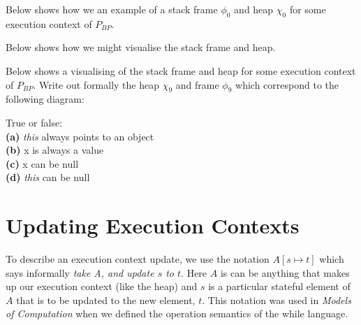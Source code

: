 \frmrule

\begin{example}
Below shows how we an example of a stack frame $\phi_0$ and heap $\chi_0$ 
for some execution context of $P_{BP}$. 


Below shows how we might visualise the stack frame and heap.

\end{example}

\frmrule

\begin{example}
Below shows a visualising of the stack frame and heap for 
some execution context of $P_{BP}$.
Write out formally the heap $\chi_9$ and frame $\phi_9$ 
which correspond to the following diagram:

\end{example}


\frmrule

\begin{example}
True or false: \\
\textbf{(a)} \textit{this} always points to an object \\
\textbf{(b)} x is always a value \\
\textbf{(c)} x can be null \\
\textbf{(d)} \textit{this} can be null
\end{example}




\section{Updating Execution Contexts}


To describe an execution context update, we use the notation 
$A[s \mapsto t]$ which says informally \textit{take A, and update
$s$ to $t$}. Here $A$ is can be anything that makes up our execution context 
(like the heap) and $s$ is a particular stateful element of $A$ that is to be 
updated to the new element, $t$. This notation was used in 
\textit{Models of Computation} when we defined the operation semantics of the 
while language.

